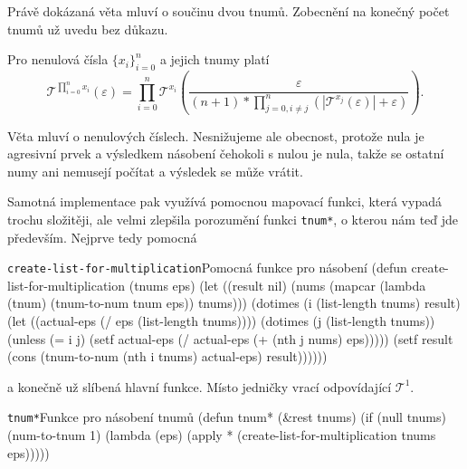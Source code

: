 Právě dokázaná věta mluví o součinu dvou tnumů. Zobecnění na konečný počet tnumů už uvedu bez důkazu.

\begin{fact}\label{vet:soucin_tnumu}
Pro nenulová čísla $\{x_i\}_{i=0}^{n}$ a jejich tnumy platí
\begin{equation}
\mathcal{T}^{\prod_{i=0}^nx_i}(\varepsilon)=\prod_{i=0}^n\mathcal{T}^{x_i}\left(\frac{\varepsilon}{(n+1)*\prod_{j=0, i\neq j}^n(|\mathcal{T}^{x_j}(\varepsilon)|+\varepsilon)}\right).
\end{equation}
\end{fact}

Věta mluví o nenulových číslech. Nesnižujeme ale obecnost, protože nula je agresivní prvek a výsledkem násobení čehokoli s nulou je nula, takže se ostatní numy ani nemusejí počítat a výsledek se může vrátit.

Samotná implementace pak využívá pomocnou mapovací funkci, která vypadá trochu složitěji, ale velmi zlepšila porozumění funkci \texttt{tnum*}, o kterou nám teď jde především. Nejprve tedy pomocná

\begin{lispcode}{\texttt{create-list-for-multiplication}}{Pomocná fun\-kce pro násobení}
(\textcolor{funkcionalni}{defun} \textcolor{pojmenovan}{create-list-for-multiplication} (tnums eps)
  (\textcolor{vedlejsi}{let} ((result nil)
      (nums
        (\textcolor{funkcionalni}{mapcar} (\textcolor{funkcionalni}{lambda} (tnum) (\textcolor{moje}{tnum-to-num} tnum eps)) tnums)))
    (\textcolor{funkcionalni}{dotimes} (i (\textcolor{funkcionalni}{list-length} tnums) result)
      (\textcolor{vedlejsi}{let} ((actual-eps (\textcolor{matematicke}{/} eps (\textcolor{funkcionalni}{list-length} tnums))))
        (\textcolor{funkcionalni}{dotimes} (j (\textcolor{funkcionalni}{list-length} tnums))
          (\textcolor{funkcionalni}{unless} (\textcolor{matematicke}{=} i j)
            (\textcolor{vedlejsi}{setf} actual-eps (\textcolor{matematicke}{/} actual-eps
              (\textcolor{matematicke}{+} (\textcolor{funkcionalni}{nth} j nums) eps)))))
        (\textcolor{vedlejsi}{setf} result (cons
          (\textcolor{moje}{tnum-to-num} (\textcolor{funkcionalni}{nth} i tnums) actual-eps) result))))))
\end{lispcode}

a konečně už slíbená hlavní funkce. Místo jedničky vrací odpovídající $\mathcal{T}^1$.

\begin{lispcode}{\texttt{tnum*}}{Funkce pro násobení tnumů}
(\textcolor{funkcionalni}{defun} \textcolor{pojmenovan}{tnum*} (&rest tnums)
  (\textcolor{funkcionalni}{if} (\textcolor{funkcionalni}{null} tnums)
    (\textcolor{moje}{num-to-tnum} 1)
    (\textcolor{funkcionalni}{lambda} (eps)
      (\textcolor{funkcionalni}{apply} \textquotesingle\textcolor{moje}{*} (\textcolor{moje}{create-list-for-multiplication} tnums eps)))))
\end{lispcode}

